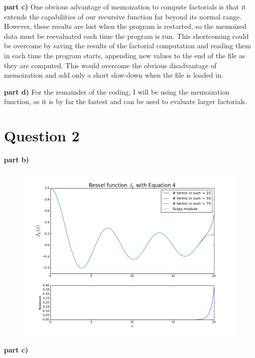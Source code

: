 \textbf{part c)} One obvious advantage of memoization to compute factorials is that it extends the capabilities of our recursive function far beyond its normal range. However, these results are lost when the program is restarted, so the memoized data must be reevaluated each time the program is run. This shortcoming could be overcome by saving the results of the factorial computation and reading them in each time the program starts, appending new values to the end of the file as they are computed. This would overcome the obvious disadvantage of memoization and add only a short slow-down when the file is loaded in.

\textbf{part d)} For the remainder of the coding, I will be using the memoization function, as it is by far the fastest and can be used to evaluate larger factorials.

\section{Question 2}

\textbf{part b)}

\begin{figure}[H]
\centering
\includegraphics[width = \linewidth]{indepq2b.png}
\caption{}
\label{fig:q2b}
\end{figure}

\textbf{part c)}

